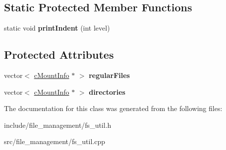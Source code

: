 \subsection*{\-Static \-Protected \-Member \-Functions}
\begin{DoxyCompactItemize}
\item 
\hypertarget{classcMountInfo_aa847892a0fc2fe52a39173c2e95ffd33}{static void {\bfseries print\-Indent} (int level)}\label{d7/d18/classcMountInfo_aa847892a0fc2fe52a39173c2e95ffd33}

\end{DoxyCompactItemize}
\subsection*{\-Protected \-Attributes}
\begin{DoxyCompactItemize}
\item 
\hypertarget{classcMountInfo_a02b0f7b087f44acc08d5259d870111b5}{vector$<$ \hyperlink{classcMountInfo}{c\-Mount\-Info} $\ast$ $>$ {\bfseries regular\-Files}}\label{d7/d18/classcMountInfo_a02b0f7b087f44acc08d5259d870111b5}

\item 
\hypertarget{classcMountInfo_abccd2011842fec9fbde9bd2fff28e17e}{vector$<$ \hyperlink{classcMountInfo}{c\-Mount\-Info} $\ast$ $>$ {\bfseries directories}}\label{d7/d18/classcMountInfo_abccd2011842fec9fbde9bd2fff28e17e}

\end{DoxyCompactItemize}


\-The documentation for this class was generated from the following files\-:\begin{DoxyCompactItemize}
\item 
include/file\-\_\-management/fs\-\_\-util.\-h\item 
src/file\-\_\-management/fs\-\_\-util.\-cpp\end{DoxyCompactItemize}

